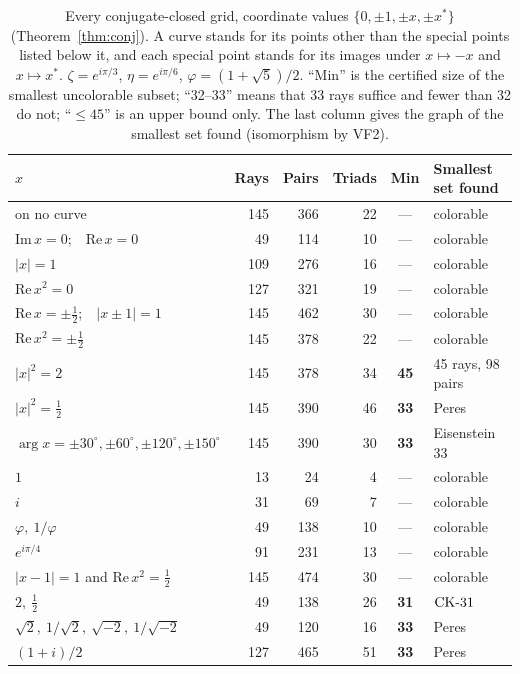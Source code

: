 \begin{table}[t]
\centering
\caption{Every conjugate-closed grid, coordinate values $\{0,\pm1,\pm x,\pm x^{*}\}$
(Theorem~\ref{thm:conj}).  A curve stands for its points other than the special points listed
below it, and each special point stands for its images under $x\mapsto-x$ and
$x\mapsto x^{*}$.  $\zeta=e^{i\pi/3}$, $\eta=e^{i\pi/6}$, $\varphi=(1+\sqrt5)/2$.  ``Min'' is
the certified size of the smallest uncolorable subset; ``32--33'' means that 33 rays suffice
and fewer than 32 do not; ``$\le45$'' is an upper bound only.  The last column gives the graph
of the smallest set found (isomorphism by VF2).}
\label{tab:conj}
\small
\begin{tabular}{@{}lrrrcl@{}}
\toprule
$x$ & Rays & Pairs & Triads & Min & Smallest set found \\
\midrule
on no curve & 145 & 366 & 22 & --- & colorable \\
$\mathrm{Im}\,x=0$;\ \ $\mathrm{Re}\,x=0$ & 49 & 114 & 10 & --- & colorable \\
$|x|=1$ & 109 & 276 & 16 & --- & colorable \\
$\mathrm{Re}\,x^2=0$ & 127 & 321 & 19 & --- & colorable \\
$\mathrm{Re}\,x=\pm\tfrac12$;\ \ $|x\pm1|=1$ & 145 & 462 & 30 & --- & colorable \\
$\mathrm{Re}\,x^2=\pm\tfrac12$ & 145 & 378 & 22 & --- & colorable \\
$|x|^2=2$ & 145 & 378 & 34 & \textbf{45} & 45 rays, 98 pairs \\
$|x|^2=\tfrac12$ & 145 & 390 & 46 & \textbf{33} & Peres \\
$\arg x=\pm30^\circ,\pm60^\circ,\pm120^\circ,\pm150^\circ$ & 145 & 390 & 30 & \textbf{33} & Eisenstein 33 \\
\midrule
$1$ & 13 & 24 & 4 & --- & colorable \\
$i$ & 31 & 69 & 7 & --- & colorable \\
$\varphi,\ 1/\varphi$ & 49 & 138 & 10 & --- & colorable \\
$e^{i\pi/4}$ & 91 & 231 & 13 & --- & colorable \\
$|x-1|=1$ and $\mathrm{Re}\,x^2=\tfrac12$ & 145 & 474 & 30 & --- & colorable \\
\midrule
$2,\ \tfrac12$ & 49 & 138 & 26 & \textbf{31} & $\mathrm{CK}\text{-}31$ \\
$\sqrt2,\ 1/\sqrt2,\ \sqrt{-2},\ 1/\sqrt{-2}$ & 49 & 120 & 16 & \textbf{33} & Peres \\
$(1+i)/2$ & 127 & 465 & 51 & \textbf{33} & Peres \\

\end{tabular}
\end{table}
